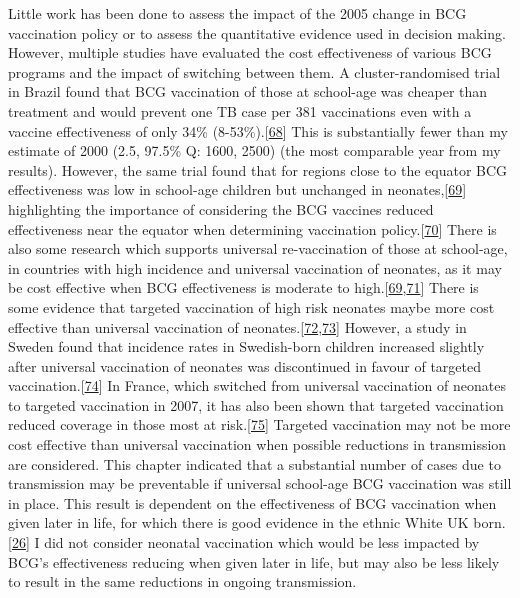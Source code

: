 \documentclass[11pt,twoside]{bristolthesis}
\begin{document}
  Little work has been done to assess the impact of the 2005 change in BCG vaccination policy or to assess the quantitative evidence used in decision making. However, multiple studies have evaluated the cost effectiveness of various BCG programs and the impact of switching between them. A cluster-randomised trial in Brazil found that BCG vaccination of those at school-age was cheaper than treatment and would prevent one TB case per 381 vaccinations even with a vaccine effectiveness of only 34\% (8-53\%).{[}\protect\hyperlink{ref-Pereira2012}{68}{]} This is substantially fewer than my estimate of 2000 (2.5, 97.5\% Q: 1600, 2500) (the most comparable year from my results). However, the same trial found that for regions close to the equator BCG effectiveness was low in school-age children but unchanged in neonates,{[}\protect\hyperlink{ref-Barreto2014a}{69}{]} highlighting the importance of considering the BCG vaccines reduced effectiveness near the equator when determining vaccination policy.{[}\protect\hyperlink{ref-Fine1995}{70}{]} There is also some research which supports universal re-vaccination of those at school-age, in countries with high incidence and universal vaccination of neonates, as it may be cost effective when BCG effectiveness is moderate to high.{[}\protect\hyperlink{ref-Barreto2014a}{69},\protect\hyperlink{ref-Dye2013a}{71}{]} There is some evidence that targeted vaccination of high risk neonates maybe more cost effective than universal vaccination of neonates.{[}\protect\hyperlink{ref-Usher2016}{72},\protect\hyperlink{ref-Hersh2003}{73}{]} However, a study in Sweden found that incidence rates in Swedish-born children increased slightly after universal vaccination of neonates was discontinued in favour of targeted vaccination.{[}\protect\hyperlink{ref-Romanus1992}{74}{]} In France, which switched from universal vaccination of neonates to targeted vaccination in 2007, it has also been shown that targeted vaccination reduced coverage in those most at risk.{[}\protect\hyperlink{ref-Guthmann2011}{75}{]} Targeted vaccination may not be more cost effective than universal vaccination when possible reductions in transmission are considered. This chapter indicated that a substantial number of cases due to transmission may be preventable if universal school-age BCG vaccination was still in place. This result is dependent on the effectiveness of BCG vaccination when given later in life, for which there is good evidence in the ethnic White UK born.{[}\protect\hyperlink{ref-Hart1972}{26}{]} I did not consider neonatal vaccination which would be less impacted by BCG's effectiveness reducing when given later in life, but may also be less likely to result in the same reductions in ongoing transmission.
  
\end{document}
